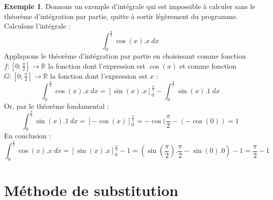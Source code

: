 \documentclass[a4paper,fontsize=13pt]{scrreprt}
\theoremstyle{plain}
\theoremstyle{definition}
\newtheorem{exe}[subsection]{Exemple}
\newcommand{\rr}{\mathbb{R}}
\begin{document}
\begin{exe}
Donnons un exemple d'intégrale qui est impossible à calculer sans le théorème d'intégration par partie, quitte à sortir légèrement du programme. Calculons l'intégrale :
$$\int_{0}^{\frac{\pi}{2}} \cos(x).x~dx$$
Appliquons le théorème d'intégration par partie en choisissant comme fonction $f : [0;\frac{\pi}{2}] \to \rr$ la fonction dont l'expression est $\cos(x)$ et comme fonction $G : [0;\frac{\pi}{2}] \to \rr$ la fonction dont l'expression est $x$ :
$$\int_{0}^{\frac{\pi}{2}} \cos(x).x~dx = [\sin(x).x]_{0}^{\frac{\pi}{2}} - \int_{0}^{\frac{\pi}{2}} \sin(x).1~dx$$
Or, par le théorème fondamental :
$$\int_{0}^{\frac{\pi}{2}} \sin(x).1~dx = [-\cos(x)]_{0}^{\frac{\pi}{2}} = -\cos(\frac{\pi}{2} - (-\cos(0)) = 1$$
En conclusion :
$$\int_{0}^{\frac{\pi}{2}} \cos(x).x~dx = [\sin(x).x]_{0}^{\frac{\pi}{2}} - 1 = (\sin(\frac{\pi}{2}).\frac{\pi}{2} - \sin(0).0) - 1 = \frac{\pi}{2}-1$$
\end{exe}

\section{Méthode de substitution}
\end{document}
